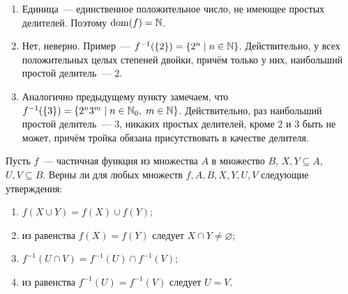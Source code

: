 \begin{Answer}
    \noindent
    \begin{enumerate}[label=\textbf{\alph*)}]
        \item
            Единица~--- единственное положительное число, не имеющее простых делителей.
            Поэтому $ \operatorname*{\textnormal{dom}}(f) = \mathbb{N} $.
        \item
            Нет, неверно.
            Пример~--- $ f^{-1}(\{ 2 \}) = \{ 2^n \mid n \in \mathbb{N} \} $.
            Действительно, у всех положительных целых степеней двойки, причём только у них, наибольший простой делитель~--- $ 2 $.
        \item
            Аналогично предыдущему пункту замечаем, что $ f^{-1}(\{ 3 \}) = \{ 2^n 3^m \mid n \in \mathbb{N}_0, \; m \in \mathbb{N} \} $.
            Действительно, раз наибольший простой делитель~--- $ 3 $,
            никаких простых делителей, кроме $ 2 $ и $ 3 $ быть не может,
            причём тройка обязана присутствовать в качестве делителя.
    \end{enumerate}
\end{Answer}


\begin{Exercise}[counter=SecExercise, label={exercise:functions:set_operations}]
    \noindent
    Пусть $ f $~--- частичная функция из множества $ A $ в множество $ B $,
    $ X, Y \subseteq A $, $ U, V \subseteq B $.
    Верны ли для любых множеств $ f, A, B, X, Y, U, V $ следующие утверждения:
    \begin{enumerate}[label=\textbf{\alph*)}]
        \item $ f (X \cup Y) = f (X) \cup f (Y) $;
        \item из равенства $ f(X) = f(Y) $ следует $ X \cap Y \neq \varnothing $;
        \item $ f^{-1}(U \cap V) = f^{-1}(U) \cap f^{-1}(V) $;
        \item из равенства $ f^{-1}(U) = f^{-1}(V) $ следует $ U = V $.
    \end{enumerate}
\end{Exercise}

